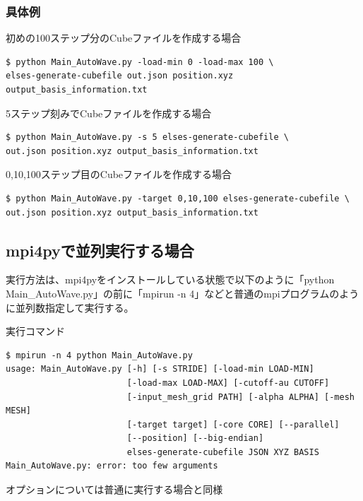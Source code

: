 \documentclass{jsarticle}
\begin{document}
\subsubsection{具体例}
初めの100ステップ分のCubeファイルを作成する場合
\begin{Verbatim}[frame=single]
$ python Main_AutoWave.py -load-min 0 -load-max 100 \
elses-generate-cubefile out.json position.xyz output_basis_information.txt
\end{Verbatim}
5ステップ刻みでCubeファイルを作成する場合
\begin{Verbatim}[frame=single]
$ python Main_AutoWave.py -s 5 elses-generate-cubefile \
out.json position.xyz output_basis_information.txt
\end{Verbatim}
0,10,100ステップ目のCubeファイルを作成する場合
\begin{Verbatim}[frame=single]
$ python Main_AutoWave.py -target 0,10,100 elses-generate-cubefile \
out.json position.xyz output_basis_information.txt
\end{Verbatim}


\subsection{mpi4pyで並列実行する場合}
実行方法は、mpi4pyをインストールしている状態で以下のように「python Main\_AutoWave.py」の前に「mpirun -n 4」などと普通のmpiプログラムのように並列数指定して実行する。

実行コマンド
\begin{Verbatim}[frame=single]
$ mpirun -n 4 python Main_AutoWave.py
usage: Main_AutoWave.py [-h] [-s STRIDE] [-load-min LOAD-MIN]
                        [-load-max LOAD-MAX] [-cutoff-au CUTOFF]
                        [-input_mesh_grid PATH] [-alpha ALPHA] [-mesh MESH]
                        [-target target] [-core CORE] [--parallel]
                        [--position] [--big-endian]
                        elses-generate-cubefile JSON XYZ BASIS
Main_AutoWave.py: error: too few arguments
\end{Verbatim}
オプションについては普通に実行する場合と同様

\end{document}
